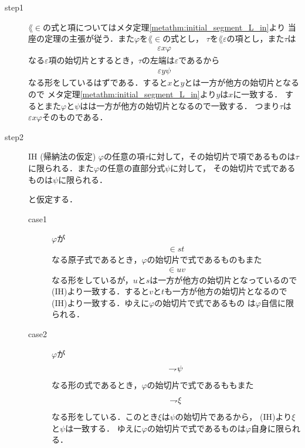 	\begin{metaprf}\mbox{}
		\begin{description}
			\item[step1]
				$\lang{\in}$の式と項についてはメタ定理\ref{metathm:initial_segment_L_in}より
				当座の定理の主張が従う．また$\varphi$を$\lang{\in}$の式とし，
				$\tau$を$\lang{\varepsilon}$の項とし，また$\tau$は
				\begin{align}
					\varepsilon x \varphi
				\end{align}
				なる$\varepsilon$項の始切片とするとき，$\tau$の左端は$\varepsilon$であるから
				\begin{align}
					\varepsilon y \psi
				\end{align}
				なる形をしているはずである．すると$x$と$y$とは一方が他方の始切片となるので
				メタ定理\ref{metathm:initial_segment_L_in}より$y$は$x$に一致する．
				するとまた$\varphi$と$\psi$はは一方が他方の始切片となるので一致する．
				つまり$\tau$は$\varepsilon x \varphi$そのものである．
				
			\item[step2]
				\begin{itembox}[l]{IH (帰納法の仮定)}
					$\varphi$の任意の項$\tau$に対して，その始切片で項であるものは$\tau$
					に限られる．また$\varphi$の任意の直部分式$\psi$に対して，
					その始切片で式であるものは$\psi$に限られる．
				\end{itembox}
				と仮定する．
				\begin{description}
					\item[case1]
						$\varphi$が
						\begin{align}
							\in s t
						\end{align}
						なる原子式であるとき，$\varphi$の始切片で式であるものもまた
						\begin{align}
							\in u v
						\end{align}
						なる形をしているが，$u$と$s$は一方が他方の始切片となっているので
						(IH)より一致する．すると$v$と$t$も一方が他方の始切片となるので
						(IH)より一致する．ゆえに$\varphi$の始切片で式であるもの
						は$\varphi$自信に限られる．
						
					\item[case2] $\varphi$が
						\begin{align}
							\rightharpoondown\hspace{-0.25em} \psi
						\end{align}
						なる形の式であるとき，$\varphi$の始切片で式であるももまた
						\begin{align}
							\rightharpoondown\hspace{-0.25em} \xi
						\end{align}
						なる形をしている．このとき$\xi$は$\psi$の始切片であるから，
						(IH)より$\xi$と$\psi$は一致する．
						ゆえに$\varphi$の始切片で式であるものは$\varphi$自身に限られる．
			

\end{description}
\end{description}
\end{metaprf}
